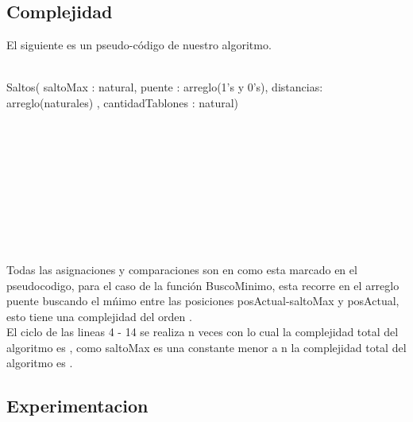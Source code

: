 \subsection{Complejidad}
El siguiente es un pseudo-c\'odigo de nuestro algoritmo.\\
\begin{algorithm}
\begin{algorithmic}[1]\parskip=1mm
 \caption{ \\Saltos( saltoMax : natural, puente : arreglo(1's y 0's), distancias: arreglo(naturales) , cantidadTablones : natural)}
		 \;\;
		 \;\;
		  \;\; \\
		\\
		 \;\; 
			 \;\; 
				 \;\; \\
				 \;\;
					\;\; \\
					 \;\;\\
					 \;\;  \\
					\;\; \\
					 \;\;\\
\\
Todas las asignaciones y comparaciones son en  como esta marcado en el pseudocodigo, para el caso de la funci\'on BuscoMinimo, esta recorre en el arreglo puente buscando el m\'nimo entre las posiciones posActual-saltoMax y posActual, esto tiene una complejidad del orden . \\
El ciclo de las lineas 4 - 14 se realiza n veces con lo cual la complejidad total del algoritmo es , como saltoMax es una constante menor a n la complejidad total del algoritmo es .
\end{algorithmic}
\end{algorithm}			
			
			
\subsection{Experimentacion}

  

 
